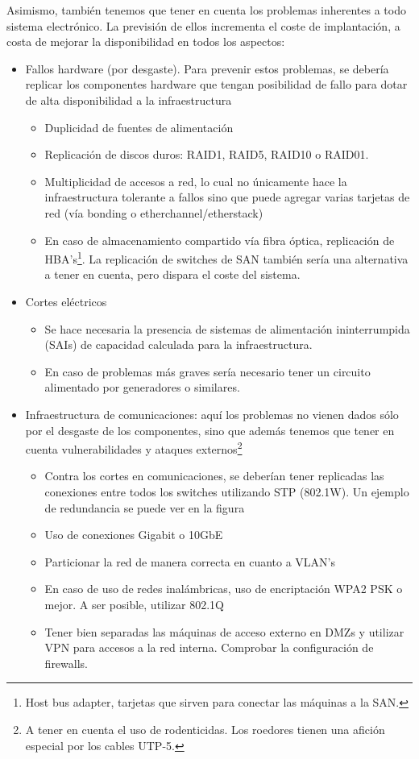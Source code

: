Asimismo, también tenemos que tener en cuenta los problemas inherentes a todo sistema electrónico. La previsión de ellos incrementa el coste de implantación, a costa de mejorar la disponibilidad en todos los aspectos\cite{hiAvailability}:
\begin{itemize}
	\item{Fallos hardware (por desgaste). Para prevenir estos problemas, se debería replicar los componentes hardware que tengan posibilidad de fallo para dotar de alta disponibilidad a la infraestructura}
	\begin{itemize}
		\item{Duplicidad de fuentes de alimentación }
		\item{Replicación de discos duros: RAID1, RAID5, RAID10 o RAID01. }
		\item{Multiplicidad de accesos a red, lo cual no únicamente hace la infraestructura tolerante a fallos sino que puede agregar varias tarjetas de red (vía bonding o etherchannel/etherstack) }
		\item{En caso de almacenamiento compartido vía fibra óptica, replicación de HBA's\footnote{Host bus adapter, tarjetas que sirven para conectar las máquinas a la SAN.}. La replicación de switches de SAN también sería una alternativa a tener en cuenta, pero dispara el coste del sistema. }
	\end{itemize}

	\item{Cortes eléctricos}
	\begin{itemize}
		\item{Se hace necesaria la presencia de sistemas de alimentación ininterrumpida (SAIs) de capacidad calculada para la infraestructura.}
		\item{En caso de problemas más graves sería necesario tener un circuito alimentado por generadores o similares.}
	\end{itemize}

	\item{Infraestructura de comunicaciones: aquí los problemas no vienen dados sólo por el desgaste de los componentes, sino que además tenemos que tener en cuenta vulnerabilidades y ataques externos\footnote{A tener en cuenta el uso de rodenticidas. Los roedores tienen una afición especial por los cables UTP-5.}}
	\begin{itemize}
		\item{Contra los cortes en comunicaciones, se deberían tener replicadas las conexiones entre todos los switches utilizando STP (802.1W). Un ejemplo de redundancia se puede ver en la figura }
		\item{Uso de conexiones Gigabit o 10GbE }
		\item{Particionar la red de manera correcta en cuanto a VLAN's}
		\item{En caso de uso de redes inalámbricas, uso de encriptación WPA2 PSK o mejor. A ser posible, utilizar 802.1Q}
		\item{Tener bien separadas las máquinas de acceso externo en DMZs y utilizar VPN para accesos a la red interna. Comprobar la configuración de firewalls.}
	\end{itemize}


\end{itemize}
